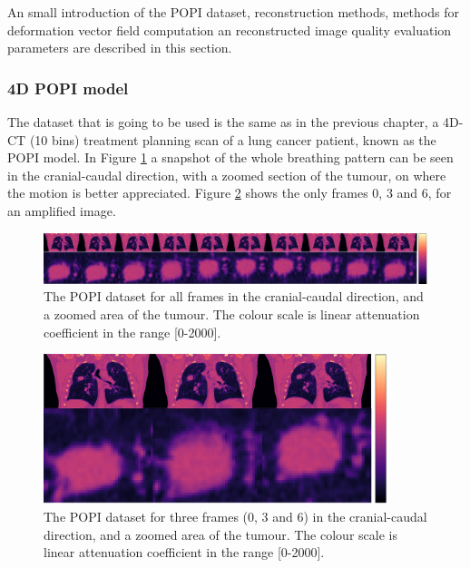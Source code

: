 An small introduction of the POPI dataset, reconstruction methods, methods for deformation vector field computation an reconstructed image quality evaluation parameters are described in this section. 






\subsubsection{4D POPI model}

The dataset that is going to be used is the same as in the previous chapter, a 4D-CT (10 bins) treatment planning scan of a lung cancer patient, known as the POPI model. In Figure \ref{fig:POPIfull} a snapshot of the whole breathing pattern can be seen in the cranial-caudal direction, with a zoomed section of the tumour, on where the motion is better appreciated. Figure \ref{fig:POPI3} shows the only frames 0, 3 and 6, for an amplified image.

\begin{figure}
\begin{center}

\includegraphics[width=\textwidth]{accuracyMC/imagerall.png} 


\end{center}

\caption[The whole 4D dataset in CC direction]{\label{fig:POPIfull} The POPI dataset for all frames in the cranial-caudal direction, and a zoomed area of the tumour.  The colour scale is linear attenuation coefficient in the range [0-2000].} 
\end{figure}
\begin{figure}
\begin{center}

\includegraphics[width=0.9\textwidth]{accuracyMC/imager3.png} 


\end{center}

\caption[Three frames of the 4D dataset in CC direction]{\label{fig:POPI3} The POPI dataset for three frames (0, 3 and 6) in the cranial-caudal direction, and a zoomed area of the tumour.  The colour scale is linear attenuation coefficient in the range [0-2000].} 
\end{figure}

